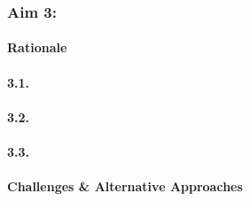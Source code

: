 \subsubsection{Aim 3: \SpecificAimThree}

\paragraph{Rationale}

\lipsum[1-1]

\paragraph{3.1. \SpecificAimThreeA}

\lipsum[2-2]

\paragraph{3.2. \SpecificAimThreeB}

\lipsum[3-3]

\paragraph{3.3. \SpecificAimThreeC}

\lipsum[3-3]

\paragraph{Challenges \& Alternative Approaches}

\lipsum[5-5]
